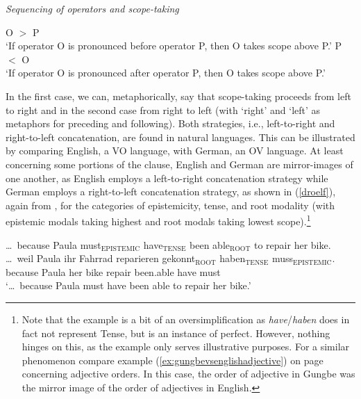 \begin{exe} 
\ex \textit{Sequencing of operators and scope-taking} \label{beispielvierzehn} 
\begin{xlist} 
\ex 		O $>$ P \\ `If operator O is pronounced before operator P, then O takes scope above P.' \label{beispielvierzehna}
\ex P $<$ O \\ `If operator O is pronounced after operator P, then O takes scope above P.' \label{beispielvierzehnb} 
\end{xlist} 
\end{exe}

\noindent In the first case, we can, metaphorically, say that scope-taking proceeds from left to right and in the second case from right to left (with `right' and `left' as metaphors for preceding and following). Both strategies, i.e., left-to-right and right-to-left concatenation, are found in natural languages. This can be illustrated by comparing English, a VO language, with German, an OV language. At least concerning some portions of the clause, English and German are mirror-images of one another, as English employs a  left-to-right concatenation strategy while German employs a right-to-left concatenation strategy, as shown in (\ref{droelf}), again from \citet[11]{bross2017scope}, for the categories of epistemicity, tense, and root modality (with epistemic modals taking highest and root modals taking lowest scope).\footnote{ Note that the example is a bit of an oversimplification as \textit{have}/\textit{haben} does in fact not represent Tense, but is an instance of perfect. However, nothing hinges on this, as the example only serves illustrative purposes. For a similar phenomenon compare example (\ref{ex:gungbevsenglishadjective}) on page \pageref{ex:gungbevsenglishadjective} concerning adjective orders. In this case, the order of adjective in Gungbe was the mirror image of the order of adjectives in English.}

\begin{exe} 
\ex \label{droelf}
\begin{xlist} 
\ex 	\dots\ because Paula must$_{\text{EPISTEMIC}}$ have$_{\text{TENSE}}$ been able$_{\text{ROOT}}$ to repair her bike.\label{beispieldreizehna}
\ex \gll \dots\ weil Paula ihr Fahrrad reparieren gekonnt$_{\text{ROOT}}$	haben$_{\text{TENSE}}$ muss$_{\text{EPISTEMIC}}$. \\
because Paula	her	bike		repair			been.able	  	have			must \\
\glt `\dots\ because Paula must have been able to repair her bike.'
 \label{beispieldreizehnb} 

\end{xlist} 
\end{exe}

